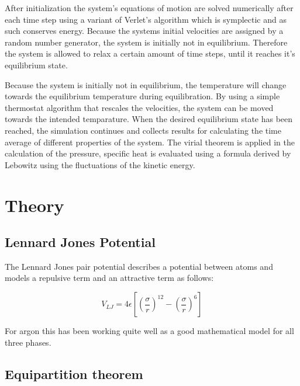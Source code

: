 \documentclass[
10pt, %
a4paper, %
oneside, %
headinclude,footinclude, %
BCOR5mm, %
]{scrartcl}
\begin{document}
After initialization the system's equations of motion are solved numerically after each time step using a variant of Verlet's algorithm which is symplectic and as such conserves energy.  Because the systems initial velocities are assigned by a random number generator, the system is initially not in equilibrium. Therefore the system is allowed to relax a certain amount of time steps, until it reaches it's equilibrium state.

Because the system is initially not in equilibrium, the temperature will change towards the equilibrium temperature during equilibration. By using a simple thermostat algorithm that rescales the velocities, the system can be moved towards the intended temparature. When the desired equilibrium state has been reached, the simulation continues and collects results for calculating the time average of different properties of the system. The virial theorem is applied in the calculation of the pressure, specific heat is evaluated using a formula derived by Lebowitz using the fluctuations of the kinetic energy\cite{Duane:1985lz}.

 
\newpage

\section{Theory}








\subsection{Lennard Jones Potential}

The Lennard Jones pair potential describes a potential between atoms and models a repulsive term and an attractive term as follows:

\begin{equation}
V_{LJ} =  4 \epsilon \left [ \left (\frac{\sigma}{r} \right )^{12} - \left ( \frac{\sigma}{r} \right )^6 \right ]
\end{equation}

For argon this has been working quite well as a good mathematical model for all three phases\cite{Rahman}. 
 
 
 \subsection{Equipartition theorem}
 
\end{document}
